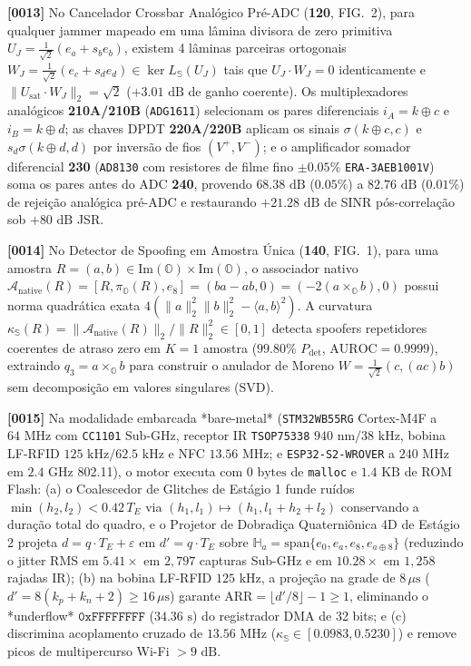 \documentclass[12pt,a4paper]{article}
\begin{document}
\textbf{[0013]} No Cancelador Crossbar Anal\'ogico Pr\'e-ADC (\textbf{120}, FIG.\ 2), para qualquer jammer mapeado em uma l\^amina divisora de zero primitiva $U_J = \frac{1}{\sqrt{2}}(e_a + s_b e_b)$, existem 4 l\^aminas parceiras ortogonais $W_J = \frac{1}{\sqrt{2}}(e_c + s_d e_d) \in \ker L_{\mathbb{S}}(U_J)$ tais que $U_J \cdot W_J = 0$ identicamente e $\|U_{\mathrm{sat}} \cdot W_J\|_2 = \sqrt{2}$ ($+3.01\text{ dB}$ de ganho coerente). Os multiplexadores anal\'ogicos \textbf{210A/210B} (\texttt{ADG1611}) selecionam os pares diferenciais $i_A = k \oplus c$ e $i_B = k \oplus d$; as chaves DPDT \textbf{220A/220B} aplicam os sinais $\sigma(k \oplus c, c)$ e $s_d \sigma(k \oplus d, d)$ por invers\~ao de fios $(V^+, V^-)$; e o amplificador somador diferencial \textbf{230} (\texttt{AD8130} com resistores de filme fino $\pm 0.05\%$ \texttt{ERA-3AEB1001V}) soma os pares antes do ADC \textbf{240}, provendo $68.38\text{ dB}$ ($0.05\%$) a $82.76\text{ dB}$ ($0.01\%$) de rejei\c{c}\~ao anal\'ogica pr\'e-ADC e restaurando $+21.28\text{ dB}$ de SINR p\'os-correla\c{c}\~ao sob $+80\text{ dB}$ JSR.

\textbf{[0014]} No Detector de Spoofing em Amostra \'Unica (\textbf{140}, FIG.\ 1), para uma amostra $R = (a, b) \in \mathrm{Im}(\mathbb{O}) \times \mathrm{Im}(\mathbb{O})$, o associador nativo $\mathcal{A}_{\mathrm{native}}(R) = [R, \pi_{\mathbb{O}}(R), e_8] = (ba - ab, 0) = (-2(a \times_{\mathbb{O}} b), 0)$ possui norma quadr\'atica exata $4(\|a\|_2^2 \|b\|_2^2 - \langle a, b \rangle^2)$. A curvatura $\kappa_{\mathbb{S}}(R) = \|\mathcal{A}_{\mathrm{native}}(R)\|_2 / \|R\|_2^2 \in [0, 1]$ detecta spoofers repetidores coerentes de atraso zero em $K=1$ amostra ($99.80\%$ $P_{\mathrm{det}}$, $\mathrm{AUROC} = 0.9999$), extraindo $q_3 = a \times_{\mathbb{O}} b$ para construir o anulador de Moreno $W = \frac{1}{\sqrt{2}}(c, (ac)b)$ sem decomposi\c{c}\~ao em valores singulares (SVD).

\textbf{[0015]} Na modalidade embarcada *bare-metal* (\texttt{STM32WB55RG} Cortex-M4F a $64\text{ MHz}$ com \texttt{CC1101} Sub-GHz, receptor IR \texttt{TSOP75338} $940\text{ nm}/38\text{ kHz}$, bobina LF-RFID $125\text{ kHz}/62.5\text{ kHz}$ e NFC $13.56\text{ MHz}$; e \texttt{ESP32-S2-WROVER} a $240\text{ MHz}$ em $2.4\text{ GHz}$ 802.11), o motor executa com $0\text{ bytes}$ de \texttt{malloc} e $1.4\text{ KB}$ de ROM Flash: (a) o Coalescedor de Glitches de Est\'agio 1 funde ru\'idos $\min(h_2, l_2) < 0.42\,T_E$ via $(h_1, l_1) \mapsto (h_1, l_1 + h_2 + l_2)$ conservando a dura\c{c}\~ao total do quadro, e o Projetor de Dobradi\c{c}a Quaterni\^onica 4D de Est\'agio 2 projeta $d = q\cdot T_E + \varepsilon$ em $d' = q\cdot T_E$ sobre $\mathbb{H}_a = \mathrm{span}\{e_0, e_a, e_8, e_{a\oplus 8}\}$ (reduzindo o jitter RMS em $5.41\times$ em $2{,}797$ capturas Sub-GHz e em $10.28\times$ em $1{,}258$ rajadas IR); (b) na bobina LF-RFID $125\text{ kHz}$, a proje\c{c}\~ao na grade de $8\,\mu\text{s}$ ($d' = 8(k_p + k_n + 2) \ge 16\,\mu\text{s}$) garante $\mathrm{ARR} = \lfloor d'/8 \rfloor - 1 \ge 1$, eliminando o *underflow* $\mathtt{0xFFFFFFFF}$ ($34.36\text{ s}$) do registrador DMA de 32 bits; e (c) discrimina acoplamento cruzado de $13.56\text{ MHz}$ ($\kappa_{\mathbb{S}} \in [0.0983, 0.5230]$) e remove picos de multipercurso Wi-Fi $>9\text{ dB}$.
\end{document}
